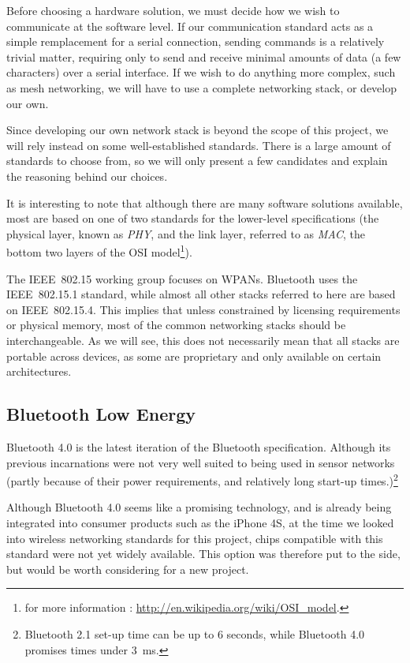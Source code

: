 Before choosing a hardware solution, we must decide how we wish to communicate
at the software level. If our communication standard acts as a simple
remplacement for a serial connection, sending commands is a relatively trivial
matter, requiring only to send and receive minimal amounts of data (a few
characters) over a serial interface.  If we wish to do anything more complex,
such as mesh networking, we will have to use a complete networking stack, or
develop our own.

Since developing our own network stack is beyond the scope of this project, we
will rely instead on some well-established standards. There is a large amount of
standards to choose from, so we will only present a few candidates and explain
the reasoning behind our choices.

It is interesting to note that although there are many software solutions
available, most are based on one of two standards for the lower-level
specifications (the physical layer, known as \emph{PHY}, and the link layer,
referred to as \emph{MAC}, the bottom two layers of the OSI model\footnote{for
more information : \url{http://en.wikipedia.org/wiki/OSI_model}.}).

The IEEE~802.15 working group focuses on \ac{WPAN}s. Bluetooth uses the
IEEE~802.15.1 standard, while almost all other stacks referred to here are based
on IEEE~802.15.4. This implies that unless constrained by licensing requirements
or physical memory, most of the common networking stacks should be
interchangeable. As we will see, this does not necessarily mean that all stacks
are portable across devices, as some are proprietary and only available on
certain architectures.

\subsection{Bluetooth Low Energy}\label{sub:bluetooth}

Bluetooth 4.0 is the latest iteration of the Bluetooth specification. Although
its previous incarnations were not very well suited to being used in sensor
networks (partly because of their power requirements, and relatively long
start-up times.)\footnote{Bluetooth 2.1 set-up time can be up to 6 seconds,
while Bluetooth 4.0 promises times under \SI{3}{ms}. }

Although Bluetooth 4.0 seems like a promising technology, and is already being
integrated into consumer products such as the iPhone 4S, at the time we looked
into wireless networking standards for this project, chips compatible with this
standard were not yet widely available. This option was therefore put to the
side, but would be worth considering for a new project.

